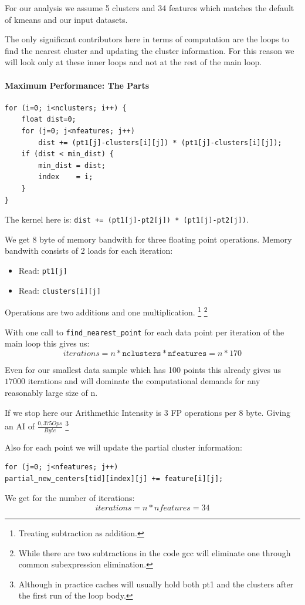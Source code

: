 For our analysis we assume 5 clusters and 34 features which matches
the default of kmeans and our input datasets.

The only significant contributors here in terms of computation are the loops to find the nearest cluster and updating the cluster information.
For this reason we will look only at these inner loops and not at the rest of the main loop.

\paragraph{Maximum Performance: The Parts}
\begin{lstlisting}[caption={Inlined representation of find\_nearest\_point}]
for (i=0; i<nclusters; i++) {
	float dist=0;
	for (j=0; j<nfeatures; j++)
		dist += (pt1[j]-clusters[i][j]) * (pt1[j]-clusters[i][j]);
	if (dist < min_dist) {
		min_dist = dist;
		index    = i;
	}
}
\end{lstlisting}
The kernel here is:
\texttt{dist += (pt1[j]-pt2[j]) * (pt1[j]-pt2[j])}.\newline

We get 8 byte of memory bandwith for three floating point operations.
Memory bandwith consists of 2 loads for each iteration:
\begin{itemize}
	\item Read: \texttt{pt1[j]}
	\item Read: \texttt{clusters[i][j]}
\end{itemize}
Operations are two additions and one multiplication.
\footnote{Treating subtraction as addition.}
\footnote{While there are two subtractions in the code gcc will eliminate one through common subexpression elimination.}


With one call to \texttt{find\_nearest\_point} for each data point per iteration of the main loop this gives us:\\
$$iterations = n * \texttt{nclusters} * \texttt{nfeatures} = n * 170$$

Even for our smallest data sample which has 100 points this already gives us $17000$ iterations and will dominate the computational demands for any reasonably large size of n.

If we stop here our Arithmethic Intensity is 3 FP operations per 8 byte. Giving an AI of $\frac{0,375 Ops}{Byte}$
\footnote{Although in practice caches will usually hold both pt1 and the clusters after the first run of the loop body.}


Also for each point we will update the partial cluster information:
\begin{lstlisting}[caption={Updating (partial) cluster information},label=lblUpdPartClst]
for (j=0; j<nfeatures; j++)
partial_new_centers[tid][index][j] += feature[i][j];
\end{lstlisting}
We get for the number of iterations:
$$iterations = n * nfeatures = 34$$

